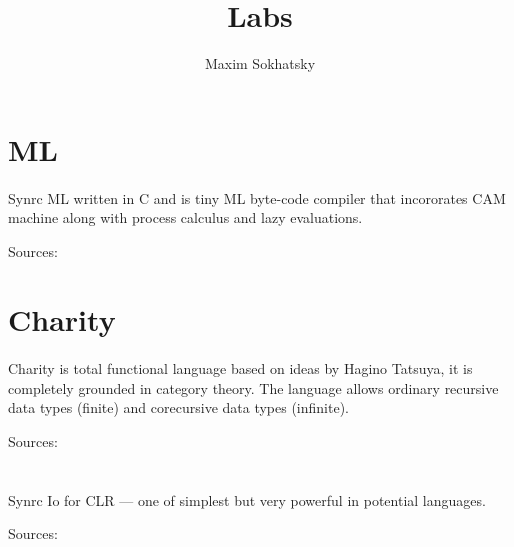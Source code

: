 \documentclass[11pt]{article}
\begin{document}
\title{Labs}
\author{Maxim Sokhatsky}


\section*{ML}
\paragraph{}
Synrc ML written in C and is tiny ML byte-code compiler that incororates CAM machine
along with process calculus and lazy evaluations.

Sources: 

\section*{Charity}
\paragraph{}
Charity is total functional language based on ideas by Hagino Tatsuya,
it is completely grounded in category theory. The language allows
ordinary recursive data types (finite) and corecursive data types (infinite).

Sources: 

\section*{}
\paragraph{}
Synrc Io for CLR --- one of simplest but very
powerful in potential languages.

Sources: 
\end{document}
